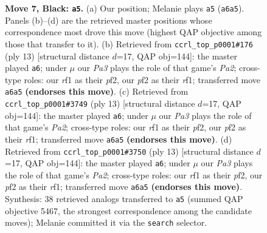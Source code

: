 \documentclass[11pt]{article}
\begin{document}
\begin{figure}[p]
\caption{\textbf{Move 7, Black: \texttt{a5}.} (a) Our position; Melanie plays \texttt{a5} (\texttt{a6a5}). Panels (b)--(d) are the retrieved master positions whose correspondence most drove this move (highest QAP objective among those that transfer to it). (b) Retrieved from \texttt{ccrl\_top\_p0001\#176} (ply 13) [structural distance $d$=17, QAP obj=144]: the master played \texttt{a6}; under $\mu$ our \emph{Pa3} plays the role of that game's \emph{Pa2}; cross-type roles: our \emph{r}f1 as their \emph{p}f2, our \emph{p}f2 as their \emph{r}f1; transferred move \texttt{a6a5} \textbf{(endorses this move)}. (c) Retrieved from \texttt{ccrl\_top\_p0001\#3749} (ply 13) [structural distance $d$=17, QAP obj=144]: the master played \texttt{a6}; under $\mu$ our \emph{Pa3} plays the role of that game's \emph{Pa2}; cross-type roles: our \emph{r}f1 as their \emph{p}f2, our \emph{p}f2 as their \emph{r}f1; transferred move \texttt{a6a5} \textbf{(endorses this move)}. (d) Retrieved from \texttt{ccrl\_top\_p0001\#3750} (ply 13) [structural distance $d$=17, QAP obj=144]: the master played \texttt{a6}; under $\mu$ our \emph{Pa3} plays the role of that game's \emph{Pa2}; cross-type roles: our \emph{r}f1 as their \emph{p}f2, our \emph{p}f2 as their \emph{r}f1; transferred move \texttt{a6a5} \textbf{(endorses this move)}. Synthesis: 38 retrieved analogs transferred to \texttt{a5} (summed QAP objective 5467, the strongest correspondence among the candidate moves); Melanie committed it via the \texttt{search} selector.}
\label{fig:thought-m13}
\end{figure}

\clearpage
\end{document}
